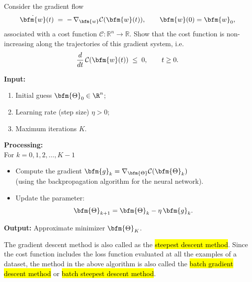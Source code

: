 \begin{problem}
Consider the gradient flow
$$
\dot{\bfm{w}}(t) \;=\; -\,\nabla_{\bfm{w}} \mathcal{C}(\bfm{w}(t)), 
\qquad \bfm{w}(0)=\bfm{w}_0,
$$
associated with a cost function $\mathcal{C}:\mathbb{R}^n \to \mathbb{R}$. Show that the cost function is non-increasing along the trajectories of this gradient system, i.e.
$$
\frac{d}{dt}\,\mathcal{C}(\bfm{w}(t)) \;\leq\; 0, \qquad t\ge0.
$$
\end{problem}


\begin{algorithm}

\textbf{Input:} 
\begin{enumerate}
\item Initial guess $\bfm{\Theta}_0 \in \R^n$;
\item Learning rate (step size) $\eta>0$;
\item Maximum iterations $K$.
\end{enumerate}
\textbf{Processing:}\\
For $k = 0,1,2,\dots,K-1$\\
\begin{itemize}[leftmargin=6em]
    \item[\textbf{Step 1:}] 
    	Compute the gradient 
$\bfm{g}_k = \nabla_{\bfm{\Theta}} \mathcal{C}(\bfm{\Theta}_k)$\\
(using the backpropagation algorithm for the neural network).
    \item[\textbf{Step 2:}]  Update the parameter:
    $$
    \bfm{\Theta}_{k+1} = \bfm{\Theta}_k - \eta \, \bfm{g}_k.
    $$
\end{itemize}
\textbf{Output:} Approximate minimizer $\bfm{\Theta}_K$.

\end{algorithm}
\begin{note}
The gradient descent method is also called as the \hl{steepest descent method}.  Since the cost function includes the loss function evaluated at all the examples of a dataset, the method in the above algorithm is also called the \hl{batch gradient descent method} or \hl{batch steepest descent method}.
\end{note}
